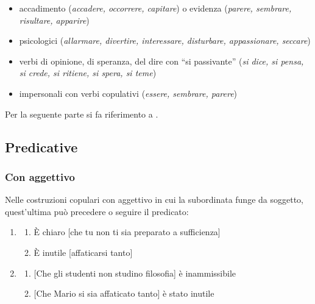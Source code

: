 \documentclass[
  a4paper,
  twoside,
  11pt,
  chapterprefix=false,
  bibliography=totocnumbered,
  listof=flat]{scrbook}
\providecommand{\tightlist}{%
  \setlength{\itemsep}{0pt}\setlength{\parskip}{0pt}}
\begin{document}
\begin{itemize}
\tightlist
\item
  accadimento (\emph{accadere, occorrere, capitare}) o evidenza (\emph{parere, sembrare, risultare, apparire})
\item
  psicologici (\emph{allarmare, divertire, interessare, disturbare, appassionare, seccare})
\item
  verbi di opinione, di speranza, del dire con \enquote{si passivante} (\emph{si dice, si pensa, si crede, si ritiene, si spera, si teme})
\item
  impersonali con verbi copulativi (\emph{essere, sembrare, parere})
\end{itemize}

Per la seguente parte si fa riferimento a \citep[660 e sgg.]{renzi1988}.

\hypertarget{predicative}{%
\subsection{Predicative}\label{predicative}}

\hypertarget{con-aggettivo}{%
\subsubsection{Con aggettivo}\label{con-aggettivo}}

Nelle costruzioni copulari con aggettivo in cui la subordinata funge da soggetto, quest'ultima può precedere o seguire il predicato:

\begin{enumerate}
\def\labelenumi{(\arabic{enumi})}
\setcounter{enumi}{28}
\item
  \begin{enumerate}
  \def\labelenumii{\alph{enumii}.}
  \tightlist
  \item
    È chiaro {[}che tu non ti sia preparato a sufficienza{]}
  \item
    È inutile {[}affaticarsi tanto{]}
  \end{enumerate}
\item
  \begin{enumerate}
  \def\labelenumii{\alph{enumii}.}
  \tightlist
  \item
    {[}Che gli studenti non studino filosofia{]} è inammissibile
  \item
    {[}Che Mario si sia affaticato tanto{]} è stato inutile
  \end{enumerate}
\end{enumerate}
\end{document}
